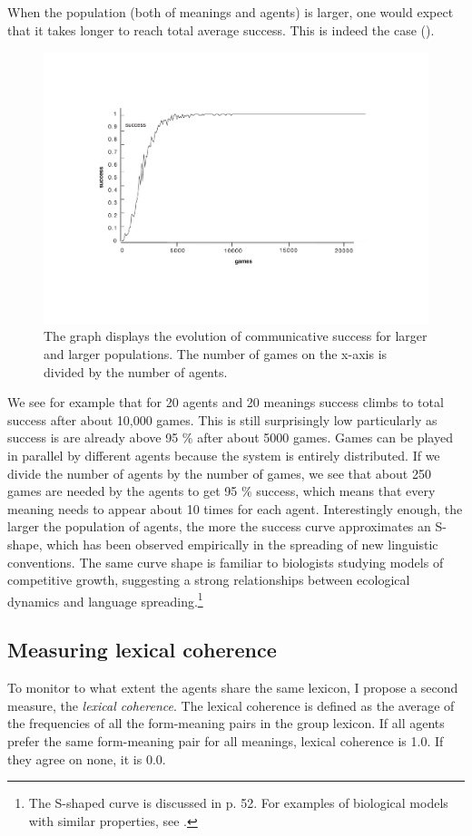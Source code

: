 When the population (both of meanings and agents) is larger, 
one would expect that it takes longer to reach total average
success. This is indeed the case (). 
\begin{figure}[htbp]
  \centerline{\includegraphics[width=.70\textwidth]{chap5/figs/larger}}
\caption{\footnotesize \label{larger} 
The graph displays the evolution of communicative success
for larger and larger populations. The
number of games on the x-axis
is divided by the number of agents. }
\end{figure}
We see for example that for 20 agents and 20 meanings 
success climbs to total success after about 10,000 games.
This is still surprisingly low particularly as
success is
are already above 95 \% after about 5000 games. Games can be played
in parallel by different agents because the system 
is entirely distributed. If we divide
the number of agents by the number of games, we see that about 250
games are needed by the agents to get 95 \% success, which means
that every meaning needs to appear about 10 times for each agent. 
Interestingly enough, the larger the population of agents, 
the more the success curve approximates an 
S-shape, which has 
been observed empirically in the spreading of new
linguistic conventions. The same curve shape is familiar to
biologists studying models of competitive growth, suggesting 
a strong relationships between ecological dynamics and language
spreading.\footnote{The S-shaped curve is discussed in \cite{McMahon:1994} p. 52. For examples
of biological models with similar properties, see \cite{May:1976}.}

\subsection{Measuring lexical coherence} 

To monitor to what extent the agents share the same
lexicon, I propose a second measure, the {\it lexical
coherence}. The lexical coherence is 
defined as the average of the frequencies of
all the form-meaning pairs in the group lexicon.
If all agents prefer the same form-meaning 
pair for all meanings, lexical coherence is 1.0. If they agree
on none, it is 0.0.

